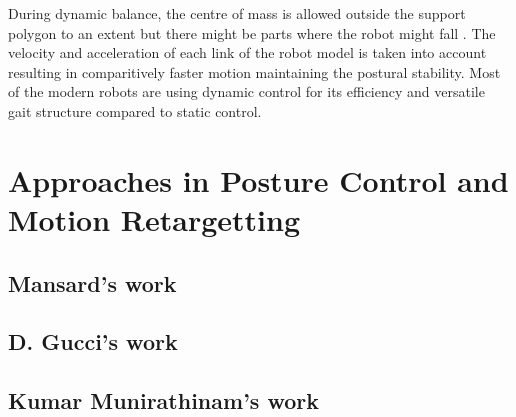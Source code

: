 During dynamic balance, the centre of mass is allowed outside the support polygon to an extent but there might be 
parts where the robot might fall \cite{katic2003survey}. The velocity and acceleration of each link of the robot
model is taken into account resulting in comparitively faster motion maintaining the postural stability. Most of the
modern robots are using dynamic control for its efficiency and versatile gait structure compared to static control.


\section{Approaches in Posture Control and Motion Retargetting}
\subsection{Mansard's work}
\subsection{D. Gucci's work}
\subsection{Kumar Munirathinam's work}

